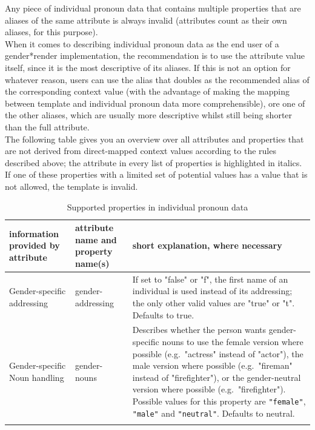\documentclass{article}
\newcommand{\GenderRender}{
    gender*render
}
\begin{document}
    Any piece of individual pronoun data that contains multiple properties that are aliases of the same attribute is always invalid (attributes count as their own aliases, for this purpose).\\

    When it comes to describing individual pronoun data as the end user of a \GenderRender implementation, the recommendation is to use the attribute value itself, since it is the most descriptive of its aliases.
    If this is not an option for whatever reason, users can use the alias that doubles as the recommended alias of the corresponding context value (with the advantage of making the mapping between template and individual pronoun data more comprehensible), ore one of the other aliases, which are usually more descriptive whilst still being shorter than the full attribute.\\

    The following table gives you an overview over all attributes and properties that are not derived from direct-mapped context values according to the rules described above;
    the attribute in every list of properties is highlighted in italics.
    If one of these properties with a limited set of potential values has a value that is not allowed, the template is invalid.\\

    \begin{flushleft}
        \begin{center}
            \begin{longtable}{|>{\raggedright\arraybackslash}p{7em} | >{\raggedright\arraybackslash}p{9em} | >{\raggedright\arraybackslash}p{14em} |}
                 \hline
                 information provided by attribute & attribute name and property name(s) & short explanation, where necessary\\
                 \hline\hline
                 Gender-specific addressing & gender-addressing & If set to "false" or "f", the first name of an individual is used instead of its addressing;
                 the only other valid values are "true" or "t".
                 Defaults to true.\\
                 \hline
                 Gender-specific Noun handling & gender-nouns & Describes whether the person wants gender-specific nouns to use the female version where possible (e.g.\ "actress" instead of "actor"), the male version where possible (e.g.\ "fireman" instead of "firefighter"), or the gender-neutral version where possible (e.g.\ "firefighter").
                 Possible values for this property are \texttt{"female"}, \texttt{"male"} and \texttt{"neutral"}.
                 Defaults to neutral.\\
                 \hline
                \caption{Supported properties in individual pronoun data}
            \end{longtable}
        \end{center}
    \end{flushleft}
\end{document}
